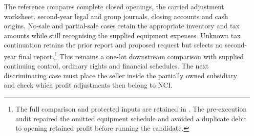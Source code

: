 The reference compares complete closed openings, the carried adjustment
worksheet, second-year legal and group journals, closing accounts and cash
origins. No-sale and partial-sale cases retain the appropriate inventory and
tax amounts while still recognising the supplied equipment expenses. Unknown
tax continuation retains the prior report and proposed request but selects
no second-year final report.\footnote{The full comparison and protected
inputs are retained in
.
The pre-execution audit repaired the omitted equipment schedule and avoided
a duplicate debit to opening retained profit before running the candidate.}
This remains a one-lot downstream comparison with supplied continuing control,
ordinary rights and financial schedules. The next discriminating case must
place the seller inside the partially owned subsidiary and check which profit
adjustments then belong to NCI.
